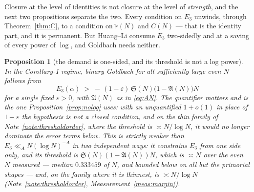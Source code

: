 \documentclass[11pt,a4paper]{article}
\theoremstyle{plain}
\newtheorem{proposition}[theorem]{Proposition}
\theoremstyle{definition}
\theoremstyle{remark}
\renewcommand{\SS}{\mathfrak{S}}
\newcommand{\AAA}{\mathfrak{A}}
\begin{document}
Closure at the level of identities is not closure at the level of
\emph{strength}, and the next two propositions separate the two. Every
condition on $E_3$ unwinds, through Theorem~\ref{thm:C}, to a
condition on $\tilde r(N)$ and $C(N)$ --- that is the identity part,
and it is permanent. But Huang--Li consume $E_3$ two-sidedly and at a
saving of every power of $\log$, and Goldbach needs neither.

\begin{proposition}[the demand is one-sided, and its threshold is not
a log power]\label{prop:onesided}
In the Corollary-1 regime, binary Goldbach for all sufficiently large
even $N$ follows from
\begin{equation}\label{eq:onesided}
  E_3(\alpha)\;>\;-\,(1-\varepsilon)\,\SS(N)\bigl(1-\AAA(N)\bigr)N
\end{equation}
for a single fixed $\varepsilon>0$, with $\AAA(N)$ as in
\eqref{eq:AN}. The quantifier matters and is the one
Proposition~\ref{prop:nolog} uses: with an unquantified $1+o(1)$ in
place of $1-\varepsilon$ the hypothesis is not a closed condition, and
on the thin family of Note~\ref{note:thresholdorder}, where the
threshold is $\asymp N/\log N$, it would no longer dominate the error
terms below. This is strictly weaker than
$E_3\ll_A N(\log N)^{-A}$ in two independent ways: it constrains $E_3$
from one side only, and its threshold is $\SS(N)(1-\AAA(N))N$, which
is $\asymp N$ over the even $N$ measured --- median $0.333459$ of $N$,
and bounded below on all but the primorial shapes --- and, on the
family where it is thinnest, is $\asymp N/\log N$
(Note~\ref{note:thresholdorder}, Measurement~\ref{meas:margin}).
\end{proposition}
\end{document}
